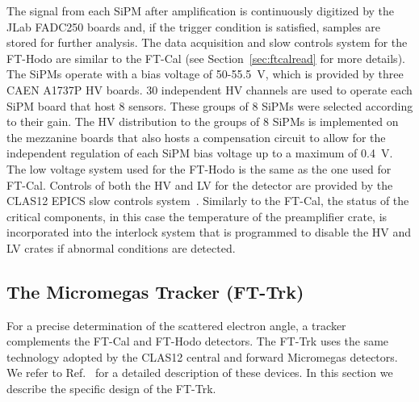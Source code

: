 The signal from each SiPM after amplification is continuously digitized by the JLab FADC250 boards and, if the
trigger condition is satisfied, samples are stored for further analysis. The data acquisition and slow controls system
for the FT-Hodo are similar to the FT-Cal (see Section~\ref{sec:ftcalread} for more details). The SiPMs operate
with a bias voltage of 50-55.5~V, which is provided by three CAEN A1737P HV boards. 30 independent HV channels
are used to operate each SiPM board that host 8 sensors. These groups of 8 SiPMs were selected according to their
gain. The HV distribution to the groups of 8 SiPMs is implemented on the mezzanine boards that also hosts a
compensation circuit to allow for the independent regulation of each SiPM bias voltage up to a maximum of 0.4~V. The
low voltage system used for the FT-Hodo is the same as the one used for FT-Cal. Controls of both the HV
and LV for the detector are provided by the CLAS12 EPICS slow controls system~\cite{daq}. Similarly to the FT-Cal,
the status of the critical components, in this case the temperature of the preamplifier crate, is incorporated into
the interlock system that is programmed to disable the HV and LV crates if abnormal conditions are detected.

\subsection{The Micromegas Tracker (FT-Trk)}

For a precise determination of the scattered electron angle, a tracker complements the FT-Cal and FT-Hodo
detectors. The FT-Trk uses the same technology adopted by the CLAS12 central and forward Micromegas detectors.
We refer to Ref.~\cite{mm} for a detailed description of  these devices. In this section we describe the specific
design of the FT-Trk.

